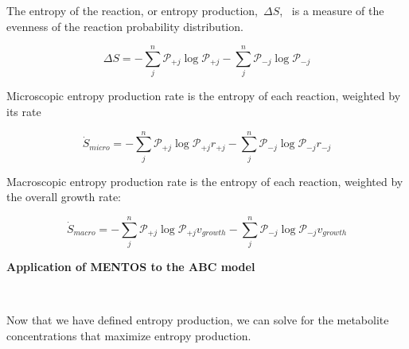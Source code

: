 \documentclass[10pt]{article}
\begin{document}
\par\null

The entropy of the reaction, or entropy production,~\(\Delta S\),~
is a measure of the evenness of the reaction probability distribution.

\begin{equation}
\Delta S = -\sum_j^n\mathcal P_{+j}\log\mathcal P_{+j} -\sum_j^n\mathcal P_{-j}\log\mathcal P_{-j} 
\end{equation}

Microscopic entropy production rate is the entropy of each reaction,
weighted by its rate

\par\null


\begin{equation}
\dot S_{micro} = -\sum_j^n\mathcal P_{+j}\log\mathcal P_{+j}r_{+j} -\sum_j^n\mathcal P_{-j}\log\mathcal P_{-j} r_{-j}
\end{equation}


Macroscopic entropy production rate is the entropy of each reaction,
weighted by the overall growth rate:

\par\null

\begin{equation}
\dot S_{macro} = -\sum_j^n\mathcal P_{+j}\log\mathcal P_{+j}v_{growth} -\sum_j^n\mathcal P_{-j}\log\mathcal P_{-j} v_{growth}
\end{equation}

\par\null

\textbf{Application of MENTOS to the ABC model}

\(\)

Now that we have defined entropy production, we can solve for the
metabolite concentrations that maximize entropy production.

\par\null\par\null
\end{document}
